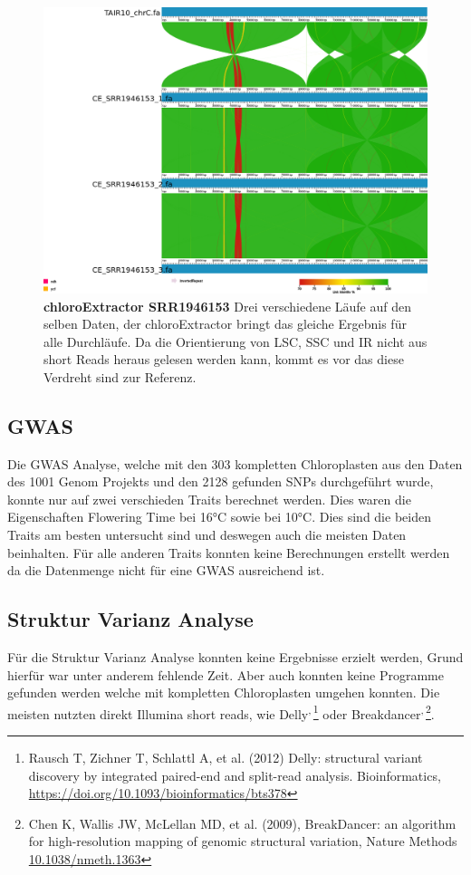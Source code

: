 \documentclass{scrartcl}
\begin{document}
\begin{figure}
\includegraphics[width=.9\linewidth]{./SRR1946153_CE_1.png}
\caption[chloroExtractor SRR1946153]{\textbf{chloroExtractor SRR1946153} Drei verschiedene Läufe auf den selben Daten, der chloroExtractor bringt das gleiche Ergebnis für alle Durchläufe. Da die Orientierung von LSC, SSC und IR nicht aus short Reads heraus gelesen werden kann, kommt es vor das diese Verdreht sind zur Referenz.}
\end{figure}
\subsection{GWAS}
\label{sec-4-8}
Die GWAS Analyse, welche mit den 303 kompletten Chloroplasten aus den Daten des 1001 Genom Projekts und den 2128 gefunden SNPs durchgeführt wurde, konnte nur auf zwei verschieden Traits berechnet werden. Dies waren 
die Eigenschaften Flowering Time bei 16°C sowie bei 10°C. Dies sind die beiden Traits am besten untersucht sind und deswegen auch die meisten Daten beinhalten. Für alle anderen Traits konnten
keine Berechnungen erstellt werden da die Datenmenge nicht für eine GWAS ausreichend ist. 
\subsection{Struktur Varianz Analyse}
\label{sec-4-9}
Für die Struktur Varianz Analyse konnten keine Ergebnisse erzielt werden, Grund hierfür war unter anderem fehlende Zeit. Aber auch konnten keine Programme gefunden werden welche mit kompletten Chloroplasten
umgehen konnten. Die meisten nutzten direkt Illumina short reads, wie Delly\footnotemark[61]{}\textsuperscript{,}\,\footnote{Rausch T, Zichner T, Schlattl A, et al. (2012) Delly: structural variant discovery by integrated paired-end and split-read analysis. Bioinformatics, \url{https://doi.org/10.1093/bioinformatics/bts378}} oder Breakdancer\footnotemark[62]{}\textsuperscript{,}\,\footnote{Chen K, Wallis JW, McLellan MD, et al. (2009), BreakDancer: an algorithm for high-resolution mapping of genomic structural variation, Nature Methods \url{10.1038/nmeth.1363}}. 
\end{document}
